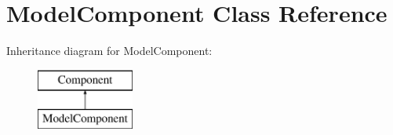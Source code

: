 \hypertarget{class_model_component}{\section{Model\+Component Class Reference}
\label{class_model_component}
}
Inheritance diagram for Model\+Component\+:\begin{figure}[H]
\begin{center}
\leavevmode
\includegraphics[height=2.000000cm]{class_model_component}
\end{center}
\end{figure}
